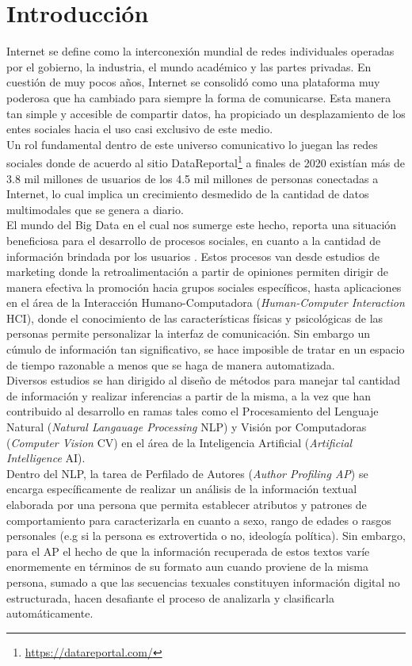 \chapter*{Introducción}
Internet se define como la interconexión mundial de redes individuales operadas por el gobierno, la industria, el mundo académico y las partes privadas. En cuestión de muy pocos años, Internet se consolidó como una plataforma muy poderosa que ha cambiado para siempre la forma de comunicarse.  Esta manera tan simple y accesible de compartir datos, ha propiciado un desplazamiento de los entes sociales hacia el uso casi exclusivo de este medio.
\\
Un rol fundamental dentro de este universo comunicativo lo juegan las redes sociales donde de acuerdo al sitio DataReportal\footnote{\url{https://datareportal.com/}} a finales de 2020 existían más de 3.8 mil millones de usuarios de los 4.5 mil millones de personas conectadas a Internet, lo cual implica un crecimiento desmedido de la cantidad de datos multimodales que se genera a diario.
\\
El mundo del Big Data \citep{Riahi2018BigDA} en el cual nos sumerge este hecho, reporta una situación beneficiosa para el desarrollo de procesos sociales, en cuanto a la cantidad de información brindada por los usuarios . 
Estos procesos van desde estudios de marketing donde la retroalimentación a partir de opiniones permiten dirigir de manera efectiva la promoción hacia grupos sociales específicos, hasta aplicaciones en el área de la Interacción Humano-Computadora (\textit{Human-Computer Interaction }HCI), donde el conocimiento de las características físicas y psicológicas de las personas permite personalizar la interfaz de comunicación. Sin embargo un cúmulo de información tan significativo, se hace imposible de tratar en un espacio de tiempo razonable a menos que se haga de manera automatizada.
\\
Diversos estudios se han dirigido al diseño de métodos para manejar tal cantidad de información y realizar inferencias a partir de la misma, a la vez que han contribuido al desarrollo en ramas tales como el Procesamiento del Lenguaje Natural (\textit{Natural Langauage Processing} NLP) y Visión por Computadoras (\textit{Computer Vision} CV) en el área de la Inteligencia Artificial (\textit{Artificial Intelligence} AI).
\\ 
Dentro del NLP, la tarea de Perfilado de Autores (\textit{Author Profiling AP}) \citep{Rosso2019,article} se encarga específicamente de realizar un análisis de la información textual elaborada por una persona que permita establecer atributos y patrones de comportamiento para caracterizarla en cuanto a sexo, rango de edades o rasgos personales (e.g si la persona es extrovertida o no, ideología política). Sin embargo, para el AP el hecho de que la información recuperada de estos textos varíe enormemente en términos de su formato aun cuando proviene de la misma persona, sumado a que las secuencias texuales constituyen información digital no estructurada, hacen desafiante el proceso de analizarla y clasificarla automáticamente. 
